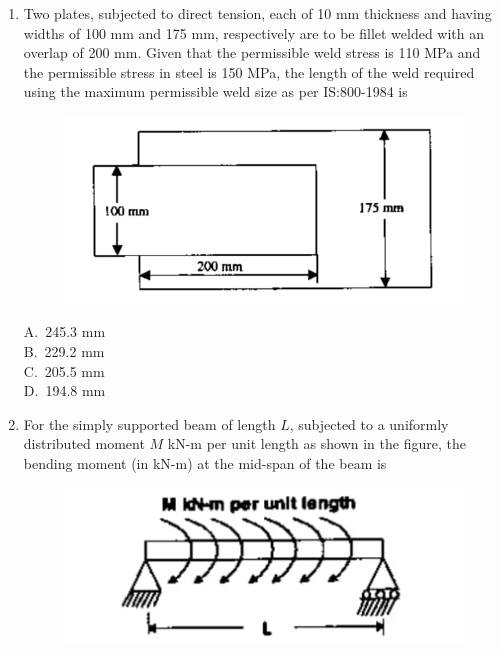 \documentclass[journal,12pt,onecolumn]{exam}
\theoremstyle{remark}
\begin{document}
\begin{enumerate}
\begin{multicols}{4}
A.\ 1083.6 kN \\
B.\ 871.32 kN \\
C.\ 541.8 kN \\
D.\ 433.7 kN
\end{multicols}

\noindent\item Two plates, subjected to direct tension, each of 10 mm thickness and having widths of 100 mm and 175 mm, respectively are to be fillet welded with an overlap of 200 mm. Given that the permissible weld stress is 110 MPa and the permissible stress in steel is 150 MPa, the length of the weld required using the maximum permissible weld size as per IS:800-1984 is \hfill{}

\begin{figure}[H]
     \centering
     \includegraphics[scale=0.5]{figs/47c2880c-f6f6-44c0-8945-4aa142a40d60.jpg} 
     \caption{}
     \label{fig:figure4}
 \end{figure}
 
\begin{multicols}{4}
A.\ 245.3 mm \\
B.\ 229.2 mm \\
C.\ 205.5 mm \\
D.\ 194.8 mm
\end{multicols}

\noindent\item For the simply supported beam of length $L$, subjected to a uniformly distributed moment $M$ kN-m per unit length as shown in the figure, the bending moment (in kN-m) at the mid-span of the beam is
\hfill{}

\begin{figure}[H]
     \centering
     \includegraphics[scale=0.55]{figs/3d041fea-5713-4739-aa3e-a69aaeca9879.jpg} 
     \caption{}
     \label{fig:figure5}
 \end{figure}
 

\end{enumerate}
\end{document}
